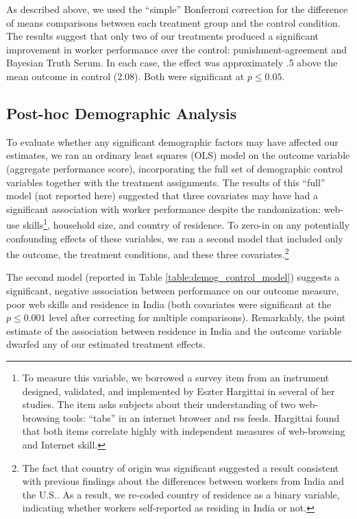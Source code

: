 \documentclass{chi2009}
\begin{document}
{As described above, we used the ``simple'' Bonferroni correction for
the difference of means comparisons between each treatment group and
the control condition. The results suggest that only two of our
treatments produced a significant improvement in worker performance
over the control: punishment-agreement and Bayesian Truth Serum. In
each case, the effect was approximately .5 above the mean outcome in
control (2.08). Both were significant at $p \leq0.05$.


\subsection{Post-hoc Demographic Analysis}
To evaluate whether any significant demographic factors may have
affected our estimates, we ran an ordinary least squares (OLS) model
on the outcome variable (aggregate performance score), incorporating
the full set of demographic control variables together with the
treatment assignments. The results of this ``full'' model (not
reported here) suggested that three covariates may have had a
significant association with worker performance despite the
randomization: web-use skills\footnote{To measure this variable, we
  borrowed a survey item from an instrument designed, validated, and
  implemented by Eszter Hargittai in several of her
  studies.\cite{hargittai2009update} The item asks subjects about
  their understanding of two web-browsing tools: ``tabs'' in an
  internet browser and rss feeds. Hargittai found that both items
  correlate highly with independent measures of web-browsing and
  Internet skill.}, household size, and country of residence. To
zero-in on any potentially confounding effects of these variables, we
ran a second model that included only the outcome, the treatment
conditions, and these three covariates.\footnote{The fact that country
  of origin was significant suggested a result consistent with
  previous findings about the differences between workers from India
  and the U.S.\cite{ipeirotis2010}. As a result, we re-coded country
  of residence as a binary variable, indicating whether workers
  self-reported as residing in India or not.}

The second model (reported in Table \ref{table:demog_control_model})
suggests a significant, negative association between performance on
our outcome measure, poor web skills and residence in India (both
covariates were significant at the $p \leq 0.001$ level after
correcting for multiple comparisons). Remarkably, the point estimate
of the association between residence in India and the outcome variable
dwarfed any of our estimated treatment effects.

}
\end{document}
